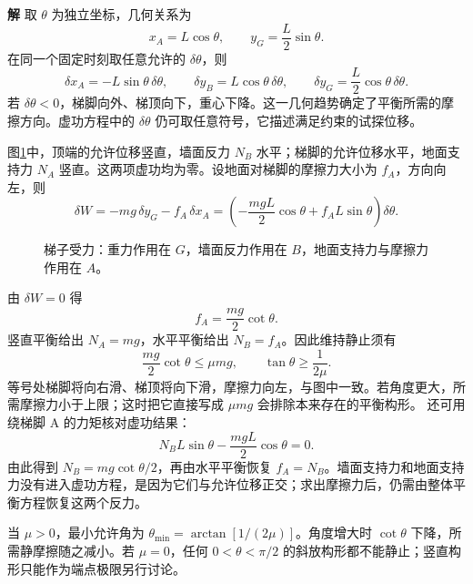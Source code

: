 \documentclass[11pt,openany,fontset=fandol]{ctexbook}
\theoremstyle{definition}\newtheorem{example}{例}[chapter]\newtheorem{exercise}{习题}[chapter]
\newcommand{\SolutionStart}{\par\medskip\ifdim\pagetotal>0pt\ifdim\dimexpr\pagegoal-\pagetotal\relax<3\baselineskip\newpage\fi\fi\noindent\textbf{解}\quad\ignorespaces}
\newenvironment{solution}{\SolutionStart}{\par\medskip}
\begin{document}
\begin{solution}
取 $\theta$ 为独立坐标，几何关系为
\[
x_A=L\cos\theta,\qquad y_G=\frac L2\sin\theta.
\]
在同一个固定时刻取任意允许的 $\delta\theta$，则
\[
\delta x_A=-L\sin\theta\,\delta\theta,\qquad
\delta y_B=L\cos\theta\,\delta\theta,\qquad
\delta y_G=\frac L2\cos\theta\,\delta\theta.
\]
若 $\delta\theta<0$，梯脚向外、梯顶向下，重心下降。这一几何趋势确定了平衡所需的摩擦方向。虚功方程中的 $\delta\theta$ 仍可取任意符号，它描述满足约束的试探位移。

图\ref{mp5:fig:l5-e4-s}中，顶端的允许位移竖直，墙面反力 $N_B$ 水平；梯脚的允许位移水平，地面支持力 $N_A$ 竖直。这两项虚功均为零。设地面对梯脚的摩擦力大小为 $f_A$，方向向左，则
\[
\delta W=-mg\,\delta y_G-f_A\,\delta x_A
=\left(-\frac{mgL}{2}\cos\theta+f_A L\sin\theta\right)\delta\theta.
\]

\begin{figure}[H]\centering
{}
\caption{梯子受力：重力作用在 $G$，墙面反力作用在 $B$，地面支持力与摩擦力作用在 $A$。}\label{mp5:fig:l5-e4-s}
\end{figure}

由 $\delta W=0$ 得
\[
f_A=\frac{mg}{2}\cot\theta.
\]
竖直平衡给出 $N_A=mg$，水平平衡给出 $N_B=f_A$。因此维持静止须有
\[
\frac{mg}{2}\cot\theta\le\mu mg,
\qquad\boxed{\tan\theta\ge\frac1{2\mu}.}
\]
等号处梯脚将向右滑、梯顶将向下滑，摩擦力向左，与图中一致。若角度更大，所需摩擦力小于上限；这时把它直接写成 $\mu mg$ 会排除本来存在的平衡构形。
还可用绕梯脚 A 的力矩核对虚功结果：
\[
N_B L\sin\theta-\frac{mgL}{2}\cos\theta=0.
\]
由此得到 $N_B=mg\cot\theta/2$，再由水平平衡恢复 $f_A=N_B$。墙面支持力和地面支持力没有进入虚功方程，是因为它们与允许位移正交；求出摩擦力后，仍需由整体平衡方程恢复这两个反力。

当 $\mu>0$，最小允许角为 $\theta_{\min}=\arctan[1/(2\mu)]$。角度增大时 $\cot\theta$ 下降，所需静摩擦随之减小。若 $\mu=0$，任何 $0<\theta<\pi/2$ 的斜放构形都不能静止；竖直构形只能作为端点极限另行讨论。

\end{solution}
\end{document}

